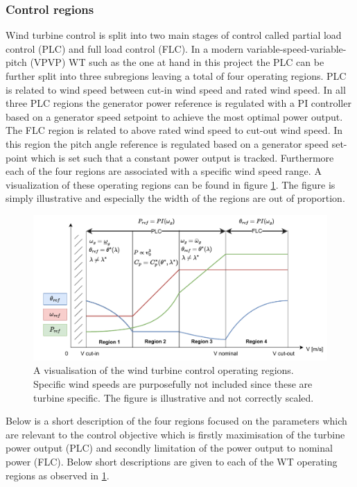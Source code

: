 \subsubsection{Control regions} \label{sec:theyry_ctrl_regions}
Wind turbine control is split into two main stages of control called partial load control (PLC) and full load control (FLC). In a modern variable-speed-variable-pitch (VPVP) WT such as the one at hand in this project the PLC can be further split into three subregions leaving a total of four operating regions. PLC is related to wind speed between cut-in wind speed and rated wind speed. In all three PLC regions the generator power reference is regulated with a PI controller based on a generator speed setpoint to achieve the most optimal power output. The FLC region is related to above rated wind speed to cut-out wind speed. In this region the pitch angle reference is regulated based on a generator speed set-point which is set such that a constant power output is tracked. Furthermore each of the four regions are associated with a specific wind speed range. A visualization of these operating regions can be found in figure \cref{fig:operating_regions}. The figure is simply illustrative and especially the width of the regions are out of proportion. 
\begin{figure}[ht]
	\centering
	\includegraphics[width=0.9\linewidth]{Graphics/OperatingRegions.pdf}
	\caption{A visualisation of the wind turbine control operating regions. Specific wind speeds are purposefully not included since these are turbine specific. The figure is illustrative and not correctly scaled.}
	\label{fig:operating_regions}
\end{figure}
Below is a short description of the four regions focused on the parameters which are relevant to the control objective which is firstly maximisation of the turbine power output (PLC) and secondly limitation of the power output to nominal power (FLC). Below short descriptions are given to each of the WT operating regions as observed in \cref{fig:operating_regions}.
